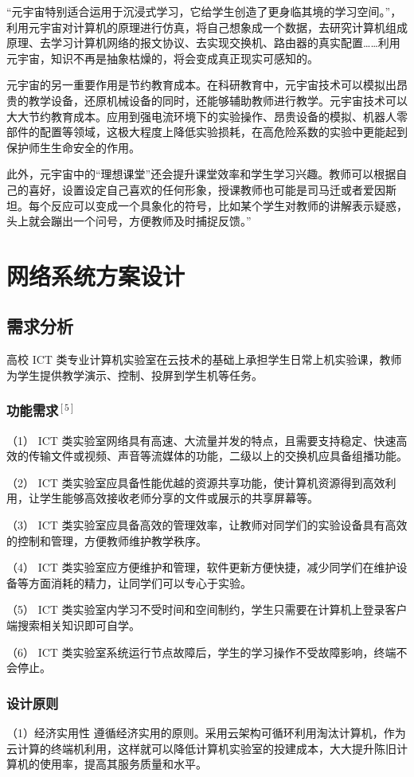 \documentclass{imutthesis}
\begin{document}
“元宇宙特别适合运用于沉浸式学习，它给学生创造了更身临其境的学习空间。”，利用元宇宙对计算机的原理进行仿真，将自己想象成一个数据，去研究计算机组成原理、去学习计算机网络的报文协议、去实现交换机、路由器的真实配置……利用元宇宙，知识不再是抽象枯燥的，将会变成真正现实可感知的。

元宇宙的另一重要作用是节约教育成本。在科研教育中，元宇宙技术可以模拟出昂贵的教学设备，还原机械设备的同时，还能够辅助教师进行教学。元宇宙技术可以大大节约教育成本。应用到强电流环境下的实验操作、昂贵设备的模拟、机器人零部件的配置等领域，这极大程度上降低实验损耗，在高危险系数的实验中更能起到保护师生生命安全的作用。

此外，元宇宙中的“理想课堂”还会提升课堂效率和学生学习兴趣。教师可以根据自己的喜好，设置设定自己喜欢的任何形象，授课教师也可能是司马迁或者爱因斯坦。每个反应可以变成一个具象化的符号，比如某个学生对教师的讲解表示疑惑，头上就会蹦出一个问号，方便教师及时捕捉反馈。”


\section{网络系统方案设计}
\subsection{需求分析}
高校 ICT 类专业计算机实验室在云技术的基础上承担学生日常上机实验课，教师为学生提供教学演示、控制、投屏到学生机等任务。
\subsubsection{功能需求$^{[5]}$}
（1） ICT 类实验室网络具有高速、大流量并发的特点，且需要支持稳定、快速高效的传输文件或视频、声音等流媒体的功能，二级以上的交换机应具备组播功能。

（2） ICT 类实验室应具备性能优越的资源共享功能，使计算机资源得到高效利用，让学生能够高效接收老师分享的文件或展示的共享屏幕等。

（3） ICT 类实验室应具备高效的管理效率，让教师对同学们的实验设备具有高效的控制和管理，方便教师维护教学秩序。

（4） ICT 类实验室应方便维护和管理，软件更新方便快捷，减少同学们在维护设备等方面消耗的精力，让同学们可以专心于实验。

（5） ICT 类实验室内学习不受时间和空间制约，学生只需要在计算机上登录客户端搜索相关知识即可自学。

（6） ICT 类实验室系统运行节点故障后，学生的学习操作不受故障影响，终端不会停止。 
\subsubsection{设计原则}
（1）经济实用性
遵循经济实用的原则。采用云架构可循环利用淘汰计算机，作为云计算的终端机利用，这样就可以降低计算机实验室的投建成本，大大提升陈旧计算机的使用率，提高其服务质量和水平。
\end{document}
